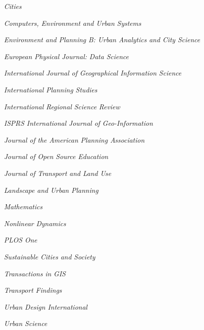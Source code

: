 \documentclass[12pt,letterpaper]{report}
\newcommand{\listitemspace}{0.15em}
\renewenvironment{itemize}
{\begin{list}{}{\setlength{\leftmargin}{0em}
			\setlength{\parskip}{0em}
			\setlength{\itemsep}{\listitemspace}
			\setlength{\parsep}{\listitemspace}}}
	{\end{list}}
\begin{document}
	\begin{itemize}

		\item \textit{Cities}

		\item \textit{Computers, Environment and Urban Systems}

		\item \textit{Environment and Planning B: Urban Analytics and City Science}

		\item \textit{European Physical Journal: Data Science}

		\item \textit{International Journal of Geographical Information Science}

		\item \textit{International Planning Studies}

		\item \textit{International Regional Science Review}

		\item \textit{ISPRS International Journal of Geo-Information}

		\item \textit{Journal of the American Planning Association}

		\item \textit{Journal of Open Source Education}

		\item \textit{Journal of Transport and Land Use}

		\item \textit{Landscape and Urban Planning}

		\item \textit{Mathematics}

		\item \textit{Nonlinear Dynamics}

		\item \textit{PLOS One}

		\item \textit{Sustainable Cities and Society}

		\item \textit{Transactions in GIS}

		\item \textit{Transport Findings}

		\item \textit{Urban Design International}

		\item \textit{Urban Science}

	\end{itemize}
\end{document}
